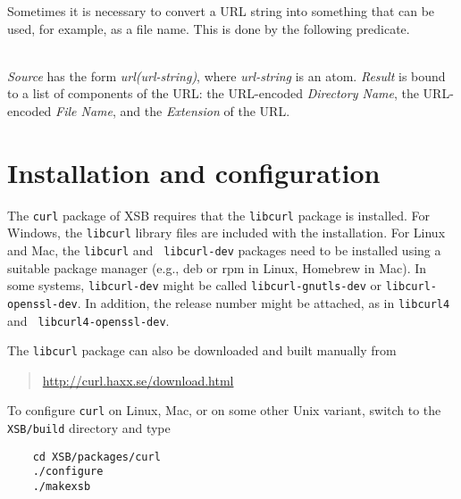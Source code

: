 Sometimes it is necessary to convert a URL string into something that can
be used, for example, as a file name. This is done by the following
predicate.

\begin{description}
  \\
{\it Source} has the form {\it url(url-string)}, where
\emph{url-string} is an atom.
{\it Result} is bound to a list of components of the URL:
the URL-encoded {\it Directory Name}, the URL-encoded {\it File Name}, and the {\it
  Extension} of the URL.

\end{description}



\section{Installation and configuration}

The {\tt curl} package of XSB requires that the {\tt libcurl} package is
installed.  For Windows, the {\tt libcurl} library files are included with
the installation. For Linux and Mac, the {\tt libcurl} and {\tt
  libcurl-dev} packages need to be installed using a suitable
package manager (e.g., deb or rpm in Linux, Homebrew in Mac). In some
systems, {\tt libcurl-dev} might be
called {\tt libcurl-gnutls-dev} or {\tt libcurl-openssl-dev}.  In addition,
the release number might be attached, as in {\tt libcurl4} and {\tt
  libcurl4-openssl-dev}.

The {\tt libcurl} package can also be downloaded and
built manually from
\begin{quote}
  \url{http://curl.haxx.se/download.html} 
\end{quote}
To configure {\tt curl} on Linux, Mac, or on some other Unix variant,
switch to the {\tt XSB/build} directory and type

\begin{verbatim}
    cd XSB/packages/curl
    ./configure
    ./makexsb
\end{verbatim}

